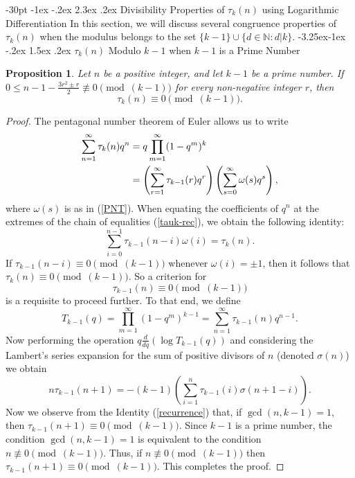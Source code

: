 \documentclass[10pt]{article}
\makeatletter
\renewcommand\section{\@startsection {section}{1}{\z@}
{-30pt \@plus -1ex \@minus -.2ex}
{2.3ex \@plus.2ex}
{\normalfont\normalsize\bfseries\boldmath}}
\renewcommand\subsection{\@startsection{subsection}{2}{\z@}
{-3.25ex\@plus -1ex \@minus -.2ex}
{1.5ex \@plus .2ex}
{\normalfont\normalsize\bfseries\boldmath}}
\newtheorem{proposition}[theorem]{Proposition}
\theoremstyle{definition}
\makeatother
\begin{document}
\section{ Divisibility Properties of $\tau_k(n)$ using Logarithmic Differentiation}
In this section, we will discuss several congruence properties of $\tau_k(n)$ when the modulus belongs to the set $\{k-1\}\cup\{d\in\mathbb N:d|k\}$.
\subsection{ $\tau_k(n)$ Modulo $k-1$ when $k-1$ is a Prime Number}
\begin{proposition}\label{modulok-1}
Let $n$ be a positive integer, and let $k-1$ be a prime number. If $0\leq n-1-\frac{3r^2\pm r}{2}\not\equiv 0\pmod{(k-1)}$ for every non-negative integer $r$, then 
\[\tau_k(n)\equiv0\pmod{(k-1)}.
\]
\end{proposition}
\begin{proof}
The pentagonal number theorem of Euler \cite{euler} allows us to write 
\begin{align}
\notag \sum_{n=1}^{\infty}\tau_k(n)q^n&=q\prod_{m=1}^{\infty}(1-q^m)^{k}\\
&\label{tauk-rec}=\left(\sum_{r=1}^{\infty}\tau_{k-1}(r)q^r\right)\left(\sum_{s=0}^{\infty}\omega(s)q^s\right),
\end{align}
where $\omega(s)$ is as in (\ref{PNT}).
When equating the coefficients of $q^n$ at the extremes of the chain of equalities (\ref{tauk-rec}), we obtain the following identity:
\[ \label{identity1}
\sum_{i=0}^{n-1}\tau_{k-1}(n-i)\omega(i)=\tau_{k}(n).
\]
If $\tau_{k-1}(n-i)\equiv0\pmod{(k-1)}$ whenever $\omega(i)=\pm1$, then it follows that $\tau_k(n)\equiv0\pmod{(k-1)}$. So a criterion for \[\tau_{k-1}(n)\equiv0\pmod{(k-1)}\] is a requisite to proceed further. 
To that end, we define 
\[
T_{k-1}(q)=\prod_{m=1}^{\infty}(1-q^m)^{k-1}=\sum_{n=1}^{\infty}\tau_{k-1}(n)q^{n-1}.
\]
Now performing the operation $q\frac{d}{dq}(\log{T_{k-1}(q)})$ and considering the Lambert's series expansion for the sum of positive divisors of $n$ (denoted $\sigma(n)$) we obtain
\begin{equation}\label{recurrence}
n\tau_{k-1}(n+1)=-(k-1)\left(\sum_{i=1}^{n}\tau_{k-1}(i)\sigma(n+1-i)\right).
\end{equation}
Now we observe from the Identity (\ref{recurrence}) that, if $\gcd(n,k-1)=1$,
then $\tau_{k-1}(n+1)\equiv 0\pmod{(k-1)}$. Since $k-1$ is a prime number, the condition $\gcd(n,k-1)=1$ is equivalent to the condition $n\not\equiv 0\pmod{(k-1)}$. Thus, if $n\not\equiv0\pmod{(k-1)}$ then $\tau_{k-1}(n+1)\equiv0\pmod{(k-1)}$. This completes the proof.
\end{proof}
\end{document}
